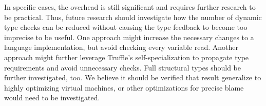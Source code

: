 
In specific cases, the overhead is still significant and requires further
research to be practical. Thus, future research should investigate how the
number of dynamic type checks can be reduced without causing
the type feedback to become too imprecise to be useful.
One approach might increase the necessary changes to a language implementation,
but avoid checking every variable read.
Another approach might further leverage Truffle's self-specialization
to propagate type requirements and avoid unnecessary checks.
Full structural types should be further investigated, too.
We believe it should be verified that \citet{Richards2017} result generalize
to highly optimizing virtual machines,
or other optimizations for precise blame would need to be investigated.

